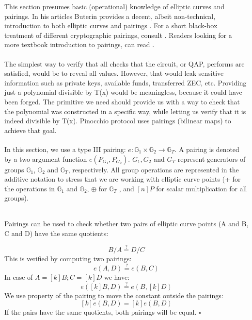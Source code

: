 This section presumes basic (operational) knowledge of elliptic curves and pairings. In his articles Buterin provides a decent, albeit non-technical, introduction to both elliptic curves and pairings \cite{buterin1, buterin2, buterin3}. For a short black-box treatment of different cryptographic pairings, consult \cite{galbraith2008pairings}. Readers looking for a more textbook introduction to pairings, can read \cite{costello2012pairings}.\\
\\
The simplest way to verify that all checks that the circuit, or QAP, performs are satisfied, would be to reveal all values. However, that would leak sensitive information such as private keys, available funds, transferred ZEC, etc. Providing just a polynomial divisible by T(x) would be meaningless, because it could have been forged. The primitive we need should provide us with a way to check that the polynomial was constructed in a specific way, while letting us verify that it is indeed divisible by T(x). Pinocchio protocol \cite{parno2013pinocchio} uses  pairings (bilinear maps) to achieve that goal.\\
\\
In this section, we use a type III pairing: $e: \mathbb{G}_1 \times \mathbb{G}_2 \to \mathbb{G}_T$. A pairing is denoted by a two-argument function $e(P_{G_1}, P_{G_2})$. $G_1, G_2$ and $G_T$ represent generators of groups $\mathbb{G}_1$, $\mathbb{G}_2$ and $\mathbb{G}_T$, respectively. All group operations are represented in the additive notation to stress that we are working with elliptic curve points (+ for the operations in $\mathbb{G}_1$ and $\mathbb{G}_2$, $\oplus$ for $\mathbb{G}_T$ , and $[n]P$ for scalar multiplication for all groups).\\
\\
\begin{exmp}
    \label{pairingexample}
    Pairings can be used to check whether two pairs of elliptic curve points (A and B, C and D) have the same quotients:

    $$ B / A \stackrel{?}{=} D / C $$
    This is verified by computing two pairings:
    $$ e(A, D) \stackrel{?}{=} e(B, C) $$
    In case of $A = [k]B; C = [k]D$ we have:
    $$ e([k]B, D) \stackrel{?}{=} e(B, [k]D)$$
    We use property of the pairing to move the constant outside the pairings:
    $$ [k]e(B, D) = [k]e(B, D) $$
    If the pairs have the same quotients, both pairings will be equal. $\square$
\end{exmp}

